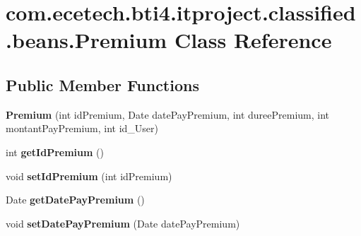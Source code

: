 \hypertarget{classcom_1_1ecetech_1_1bti4_1_1itproject_1_1classified_1_1beans_1_1_premium}{}\section{com.\+ecetech.\+bti4.\+itproject.\+classified.\+beans.\+Premium Class Reference}
\label{classcom_1_1ecetech_1_1bti4_1_1itproject_1_1classified_1_1beans_1_1_premium}
\subsection*{Public Member Functions}
\begin{DoxyCompactItemize}
\item 
{\bfseries Premium} (int id\+Premium, Date date\+Pay\+Premium, int duree\+Premium, int montant\+Pay\+Premium, int id\+\_\+\+User)\hypertarget{classcom_1_1ecetech_1_1bti4_1_1itproject_1_1classified_1_1beans_1_1_premium_ae0246a5431bb7775e739eec4da8282b0}{}\label{classcom_1_1ecetech_1_1bti4_1_1itproject_1_1classified_1_1beans_1_1_premium_ae0246a5431bb7775e739eec4da8282b0}

\item 
int {\bfseries get\+Id\+Premium} ()\hypertarget{classcom_1_1ecetech_1_1bti4_1_1itproject_1_1classified_1_1beans_1_1_premium_a1cf045747d0b7762ea86f8d8f1f502ff}{}\label{classcom_1_1ecetech_1_1bti4_1_1itproject_1_1classified_1_1beans_1_1_premium_a1cf045747d0b7762ea86f8d8f1f502ff}

\item 
void {\bfseries set\+Id\+Premium} (int id\+Premium)\hypertarget{classcom_1_1ecetech_1_1bti4_1_1itproject_1_1classified_1_1beans_1_1_premium_ab0b1e71196288d854692e804f9f2a166}{}\label{classcom_1_1ecetech_1_1bti4_1_1itproject_1_1classified_1_1beans_1_1_premium_ab0b1e71196288d854692e804f9f2a166}

\item 
Date {\bfseries get\+Date\+Pay\+Premium} ()\hypertarget{classcom_1_1ecetech_1_1bti4_1_1itproject_1_1classified_1_1beans_1_1_premium_a18494e3c979bbe135528a5e265594d76}{}\label{classcom_1_1ecetech_1_1bti4_1_1itproject_1_1classified_1_1beans_1_1_premium_a18494e3c979bbe135528a5e265594d76}

\item 
void {\bfseries set\+Date\+Pay\+Premium} (Date date\+Pay\+Premium)\hypertarget{classcom_1_1ecetech_1_1bti4_1_1itproject_1_1classified_1_1beans_1_1_premium_ae864a611e032fec5c20609d72f9d59b4}{}\label{classcom_1_1ecetech_1_1bti4_1_1itproject_1_1classified_1_1beans_1_1_premium_ae864a611e032fec5c20609d72f9d59b4}


\end{DoxyCompactItemize}
